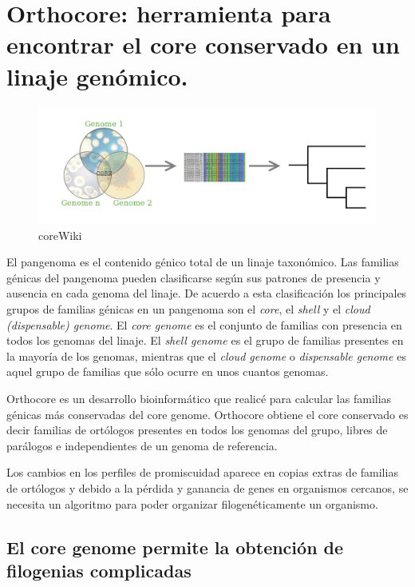 \documentclass[]{article}
\title{}
\author{}
\date{}
\begin{document}
\section{Orthocore: herramienta para encontrar el core conservado en un
linaje
genómico.}\label{orthocore-herramienta-para-encontrar-el-core-conservado-en-un-linaje-genomico.}

\begin{figure}[h!tbp]
\centering
\includegraphics[angle = 0,scale = 1]{chapter1/coreWiki.png}
\caption[coreWiki]{\normalsize{coreWiki}}
\label{fig:coreWiki}
\end{figure}

El pangenoma es el contenido génico total de un linaje taxonómico. Las
familias génicas del pangenoma pueden clasificarse según sus patrones de
presencia y ausencia en cada genoma del linaje. De acuerdo a esta
clasificación los principales grupos de familias génicas en un pangenoma
son el \emph{core}, el \emph{shell} y el \emph{cloud (dispensable)
genome}. El \emph{core genome} es el conjunto de familias con presencia
en todos los genomas del linaje. El \emph{shell genome} es el grupo de
familias presentes en la mayoría de los genomas, mientras que el
\emph{cloud genome} o \emph{dispensable genome} es aquel grupo de
familias que sólo ocurre en unos cuantos genomas.

Orthocore es un desarrollo bioinformático que realicé para calcular las
familias génicas más conservadas del core genome. Orthocore obtiene el
core conservado es decir familias de ortólogos presentes en todos los
genomas del grupo, libres de parálogos e independientes de un genoma de
referencia.

Los cambios en los perfiles de promiscuidad aparece en copias extras de
familias de ortólogos y debido a la pérdida y ganancia de genes en
organismos cercanos, se necesita un algoritmo para poder organizar
filogenéticamente un organismo.

\subsection{El core genome permite la obtención de filogenias
complicadas}\label{el-core-genome-permite-la-obtencion-de-filogenias-complicadas}
\end{document}
